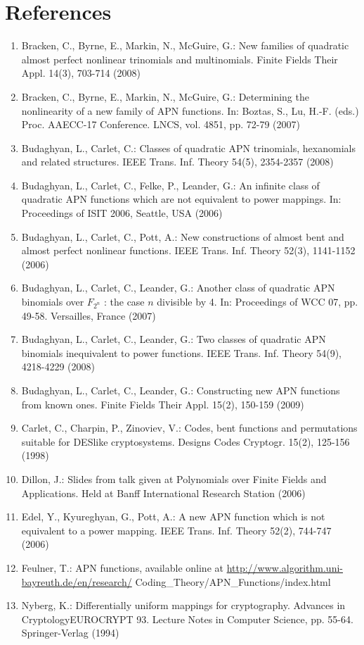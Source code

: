 \documentclass[10pt]{article}
\begin{document}
\section*{References}
\begin{enumerate}
  \item Bracken, C., Byrne, E., Markin, N., McGuire, G.: New families of quadratic almost perfect nonlinear trinomials and multinomials. Finite Fields Their Appl. 14(3), 703-714 (2008)
  \item Bracken, C., Byrne, E., Markin, N., McGuire, G.: Determining the nonlinearity of a new family of APN functions. In: Boztas, S., Lu, H.-F. (eds.) Proc. AAECC-17 Conference. LNCS, vol. 4851, pp. 72-79 (2007)
  \item Budaghyan, L., Carlet, C.: Classes of quadratic APN trinomials, hexanomials and related structures. IEEE Trans. Inf. Theory 54(5), 2354-2357 (2008)
  \item Budaghyan, L., Carlet, C., Felke, P., Leander, G.: An infinite class of quadratic APN functions which are not equivalent to power mappings. In: Proceedings of ISIT 2006, Seattle, USA (2006)
  \item Budaghyan, L., Carlet, C., Pott, A.: New constructions of almost bent and almost perfect nonlinear functions. IEEE Trans. Inf. Theory 52(3), 1141-1152 (2006)
  \item Budaghyan, L., Carlet, C., Leander, G.: Another class of quadratic APN binomials over $F_{2^{n}}$ : the case $n$ divisible by 4. In: Proceedings of WCC 07, pp. 49-58. Versailles, France (2007)
  \item Budaghyan, L., Carlet, C., Leander, G.: Two classes of quadratic APN binomials inequivalent to power functions. IEEE Trans. Inf. Theory 54(9), 4218-4229 (2008)
  \item Budaghyan, L., Carlet, C., Leander, G.: Constructing new APN functions from known ones. Finite Fields Their Appl. 15(2), 150-159 (2009)
  \item Carlet, C., Charpin, P., Zinoviev, V.: Codes, bent functions and permutations suitable for DESlike cryptosystems. Designs Codes Cryptogr. 15(2), 125-156 (1998)
  \item Dillon, J.: Slides from talk given at Polynomials over Finite Fields and Applications. Held at Banff International Research Station (2006)
  \item Edel, Y., Kyureghyan, G., Pott, A.: A new APN function which is not equivalent to a power mapping. IEEE Trans. Inf. Theory 52(2), 744-747 (2006)
  \item Feulner, T.: APN functions, available online at \href{http://www.algorithm.uni-bayreuth.de/en/research/}{http://www.algorithm.uni-bayreuth.de/en/research/} Coding\_Theory/APN\_Functions/index.html
  \item Nyberg, K.: Differentially uniform mappings for cryptography. Advances in CryptologyEUROCRYPT 93. Lecture Notes in Computer Science, pp. 55-64. Springer-Verlag (1994)
\end{enumerate}
\end{document}
